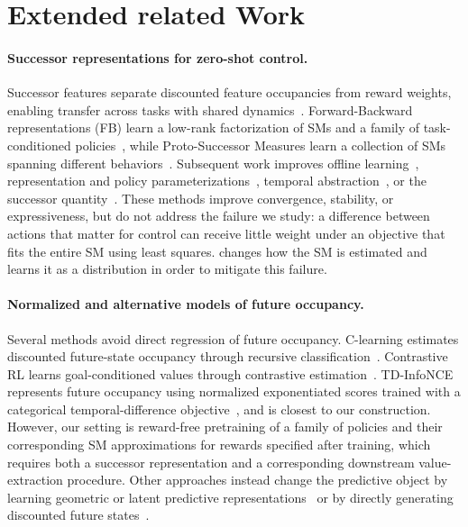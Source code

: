 \section{Extended related Work}
\label{app:related}

\paragraph{Successor representations for zero-shot control.}
Successor features separate discounted feature occupancies from reward weights, enabling transfer across tasks with shared dynamics~\citep{dayan-nc93a,barreto-neurips17}.
Forward-Backward representations (FB) learn a low-rank factorization of SMs and a family of task-conditioned policies~\citep{touati-neurips21a,touati-iclr23b}, while Proto-Successor Measures learn a collection of SMs spanning different behaviors~\citep{agarwal-icml25a}.
Subsequent work improves offline learning~\citep{jeen-neurips24a}, representation and policy parameterizations~\citep{cetin-rlj24a}, temporal abstraction~\citep{azad-arxiv26a}, or the successor quantity~\citep{dubail-neurips25a}.
These methods improve convergence, stability, or expressiveness, but do not address the failure we study: a difference between actions that matter for control can receive little weight under an objective that fits the entire SM using least squares.
\name{} changes how the SM is estimated and learns it as a distribution in order to mitigate this failure.

\paragraph{Normalized and alternative models of future occupancy.}
Several methods avoid direct regression of future occupancy.
C-learning estimates discounted future-state occupancy through recursive classification~\citep{eysenbach-iclr21a}.
Contrastive RL learns goal-conditioned values through contrastive estimation~\citep{eysenbach-neurips22a}.
TD-InfoNCE represents future occupancy using normalized exponentiated scores trained with a categorical temporal-difference objective~\citep{zheng-iclr24a}, and is closest to our construction.
However, our setting is reward-free pretraining of a family of policies and their corresponding SM approximations for rewards specified after training, which requires both a successor representation and a corresponding downstream value-extraction procedure.
Other approaches instead change the predictive object by learning geometric or latent predictive representations~\citep{park-iclr24a,jajoo-iclr26a,bagatella-iclr26a} or by directly generating discounted future states~\citep{janner-neurips20a,farebrother-iclr25a,zheng-iclr26a}.

